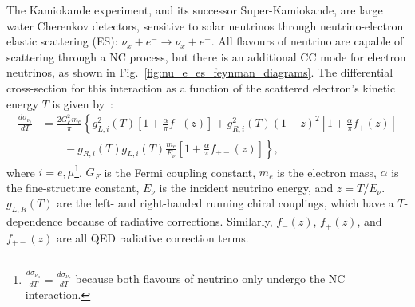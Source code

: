
The Kamiokande experiment, and its successor Super-Kamiokande, are large water Cherenkov detectors, sensitive to solar neutrinos through neutrino-electron elastic scattering (ES): $\nu_{x} + e^{-}\to\nu_{x} + e^{-}$. All flavours of neutrino are capable of scattering through a NC process, but there is an additional CC mode for electron neutrinos, as shown in Fig.~\ref{fig:nu_e_es_feynman_diagrams}. The differential cross-section for this interaction as a function of the scattered electron's kinetic energy $T$ is given by~\cite{bahcallSolarNeutrinosRadiative1995}: %
\begin{align}\label{eq:enu_es_xsec}
    \frac{d\sigma_{\nu_{i}}}{dT} &= \frac{2G_{F}^{2}m_{e}}{\pi}\left\{
        g_{L,i}^{2}(T)\left[
            1 + \frac{\alpha}{\pi}f_{-}(z)
        \right]
        + g_{R,i}^{2}(T)(1-z)^{2}\left[
            1 + \frac{\alpha}{\pi}f_{+}(z)
        \right]\right.\nonumber\\
        &\qquad \left. {}
        -g_{R,i}(T)g_{L,i}(T)\frac{m_{e}}{E_{\nu}}\left[
            1 + \frac{\alpha}{\pi}f_{+-}(z)
        \right]
    \right\},
\end{align}
where $i = e, \mu$\footnote{
    $\frac{d\sigma_{\nu_{\mu}}}{dT} = \frac{d\sigma_{\nu_{\tau}}}{dT}$ because both flavours of neutrino only undergo the NC interaction.
}, $G_{F}$ is the Fermi coupling constant, $m_{e}$ is the electron mass, $\alpha$ is the fine-structure constant, $E_{\nu}$ is the incident neutrino energy, and $z = T/E_{\nu}$. $g_{L,R}(T)$ are the left- and right-handed running chiral couplings, which have a $T$-dependence because of radiative corrections. Similarly, $f_{-}(z)$, $f_{+}(z)$, and $f_{+-}(z)$ are all QED radiative correction terms. 

